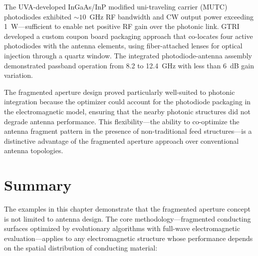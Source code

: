The UVA-developed InGaAs/InP modified uni-traveling carrier (MUTC) photodiodes exhibited $\sim\!10$~GHz RF bandwidth and CW output power exceeding 1~W---sufficient to enable net positive RF gain over the photonic link.  GTRI developed a custom coupon board packaging approach that co-locates four active photodiodes with the antenna elements, using fiber-attached lenses for optical injection through a quartz window.  The integrated photodiode-antenna assembly demonstrated passband operation from 8.2 to 12.4~GHz with less than 6~dB gain variation.

The fragmented aperture design proved particularly well-suited to photonic integration because the optimizer could account for the photodiode packaging in the electromagnetic model, ensuring that the nearby photonic structures did not degrade antenna performance.  This flexibility---the ability to co-optimize the antenna fragment pattern in the presence of non-traditional feed structures---is a distinctive advantage of the fragmented aperture approach over conventional antenna topologies.


\section{Summary}

The examples in this chapter demonstrate that the fragmented aperture concept is not limited to antenna design.  The core methodology---fragmented conducting surfaces optimized by evolutionary algorithms with full-wave electromagnetic evaluation---applies to any electromagnetic structure whose performance depends on the spatial distribution of conducting material:

